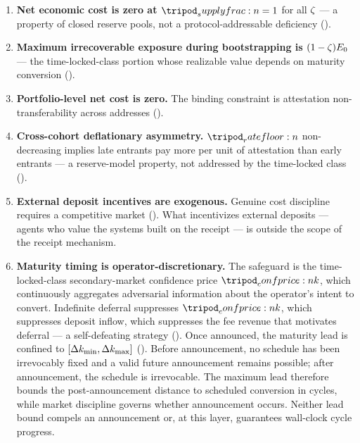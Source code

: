 \documentclass[../main.tex]{subfiles}
\begin{document}
\begin{enumerate}[nosep]
    \item \textbf{Net economic cost is zero at $\supplyfrac{} = 1$} for all $\zeta$ ---
        a property of closed reserve pools, not a protocol-addressable deficiency
        ().

    \item \textbf{Maximum irrecoverable exposure during bootstrapping is
        $(1-\zeta)E\sb{0}$} --- the time-locked-class portion whose realizable
        value depends on maturity conversion ().

    \item \textbf{Portfolio-level net cost is zero.} The binding constraint is attestation
        non-transferability across addresses
        ().

    \item \textbf{Cross-cohort deflationary asymmetry.} $\ratefloor{}$ non-decreasing
        implies late entrants pay more per unit of attestation than early entrants --- a
        reserve-model property, not addressed by the time-locked class
        ().

    \item \textbf{External deposit incentives are exogenous.} Genuine cost discipline
        requires a competitive market (). What incentivizes external
        deposits --- agents who value the systems built on the receipt --- is outside the
        scope of the receipt mechanism.

    \item \textbf{Maturity timing is operator-discretionary.} The safeguard is the
        time-locked-class secondary-market confidence price $\confprice{k}$, which
        continuously aggregates adversarial information about the operator's intent to
        convert. Indefinite deferral suppresses $\confprice{k}$, which suppresses deposit
        inflow, which suppresses the fee revenue that motivates deferral --- a self-defeating
        strategy
        ().
        Once announced, the maturity lead is confined to $[\Delta k\sb{\min}, \Delta k\sb{\max}]$
        (). Before announcement, no schedule has been
        irrevocably fixed and a valid future announcement remains possible; after
        announcement, the schedule is irrevocable. The maximum lead therefore bounds the
        post-announcement distance to scheduled conversion in cycles, while market
        discipline governs whether announcement occurs. Neither lead bound compels an
        announcement or, at this layer, guarantees wall-clock cycle progress.
\end{enumerate}
\end{document}
